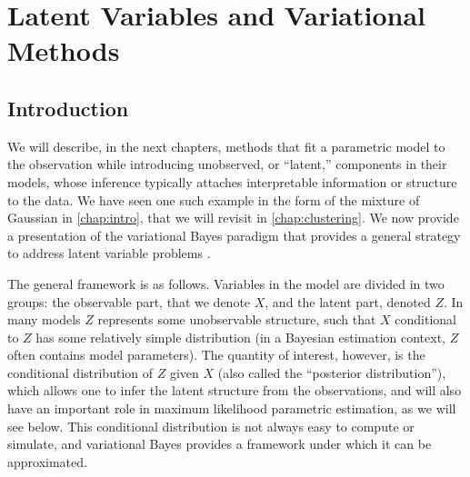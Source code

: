 \chapter{Latent Variables and Variational Methods}
\label{chap:var.bayes}

\section{Introduction}

We will describe, in the next chapters, methods that fit a parametric model to the observation while introducing  unobserved, or ``latent,'' components in their models, whose inference typically attaches  interpretable information or structure  to the data. We have seen one such example in the form of the mixture of Gaussian in \cref{chap:intro}, that we will revisit in \cref{chap:clustering}. We now provide a  presentation of the variational Bayes paradigm that provides a general strategy to address latent variable problems \citep{neal1998view,jaakkola1997variational,
attias1999variational,jordan1999introduction}. 

The general framework is as follows. Variables in the model  are divided in two groups: the observable part, that we denote  $X$, and the latent part, denoted $Z$. In many models $Z$ represents some unobservable structure, such that $X$ conditional to $Z$ has some relatively simple distribution (in a Bayesian estimation context, $Z$ often contains model parameters). The quantity of interest, however, is the conditional distribution of $Z$ given $X$ (also called the ``posterior distribution''), which allows one to infer the latent structure from the observations, and will also have an important role in maximum likelihood parametric estimation, as we will see below. This conditional distribution is not always easy to compute or simulate, and variational Bayes provides a framework under which it can be approximated. 



